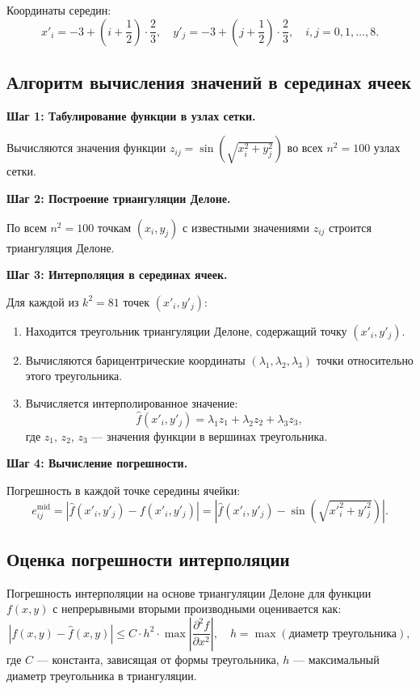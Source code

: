 \documentclass[a4paper, 14pt]{extarticle}
\begin{document}
Координаты середин:
\[
x'_i = -3 + \left(i + \frac{1}{2}\right) \cdot \frac{2}{3}, \quad y'_j = -3 + \left(j + \frac{1}{2}\right) \cdot \frac{2}{3}, \quad i, j = 0, 1, \ldots, 8.
\]

\subsection{Алгоритм вычисления значений в серединах ячеек}

\textbf{Шаг 1: Табулирование функции в узлах сетки.}

Вычисляются значения функции $z_{ij} = \sin\!\left(\sqrt{x_i^2 + y_j^2}\right)$ во всех $n^2 = 100$ узлах сетки.

\textbf{Шаг 2: Построение триангуляции Делоне.}

По всем $n^2 = 100$ точкам $(x_i, y_j)$ с известными значениями $z_{ij}$ строится триангуляция Делоне.

\textbf{Шаг 3: Интерполяция в серединах ячеек.}

Для каждой из $k^2 = 81$ точек $(x'_i, y'_j)$:
\begin{enumerate}
  \item Находится треугольник триангуляции Делоне, содержащий точку $(x'_i, y'_j)$.
  \item Вычисляются барицентрические координаты $(\lambda_1, \lambda_2, \lambda_3)$ точки относительно этого треугольника.
  \item Вычисляется интерполированное значение:
  \[
  \hat{f}(x'_i, y'_j) = \lambda_1 z_1 + \lambda_2 z_2 + \lambda_3 z_3,
  \]
  где $z_1$, $z_2$, $z_3$ --- значения функции в вершинах треугольника.
\end{enumerate}

\textbf{Шаг 4: Вычисление погрешности.}

Погрешность в каждой точке середины ячейки:
\[
e^{\text{mid}}_{ij} = \left|\hat{f}(x'_i, y'_j) - f(x'_i, y'_j)\right| = \left|\hat{f}(x'_i, y'_j) - \sin\!\left(\sqrt{x'^2_i + y'^2_j}\right)\right|.
\]

\subsection{Оценка погрешности интерполяции}

Погрешность интерполяции на основе триангуляции Делоне для функции $f(x, y)$ с непрерывными вторыми производными оценивается как:
\[
|f(x, y) - \hat{f}(x, y)| \leq C \cdot h^2 \cdot \max\left|\frac{\partial^2 f}{\partial x^2}\right|, \quad h = \max(\text{диаметр треугольника}),
\]
где $C$ --- константа, зависящая от формы треугольника, $h$ --- максимальный диаметр треугольника в триангуляции.
\end{document}
